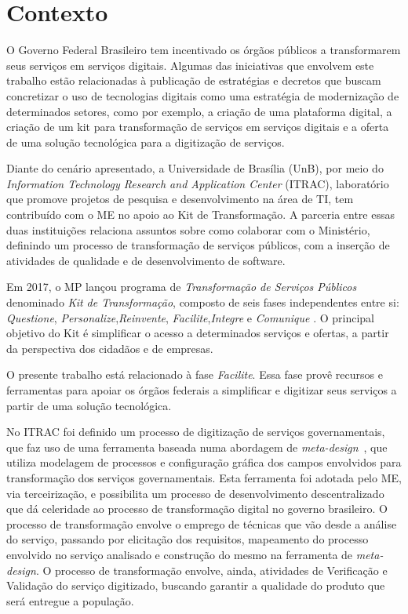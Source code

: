 \section{Contexto}

O Governo Federal Brasileiro tem incentivado os órgãos públicos a transformarem seus serviços em serviços digitais. Algumas das iniciativas que envolvem este trabalho estão relacionadas à publicação de estratégias e decretos que buscam concretizar o uso de tecnologias digitais como uma estratégia de modernização de determinados setores, como por exemplo, a criação de uma plataforma digital, a criação de um kit para transformação de serviços em serviços digitais e a oferta de uma solução tecnológica para a digitização de serviços. 

Diante do cenário apresentado, a Universidade de Brasília (UnB), por meio do \textit{Information Technology Research and Application Center} (ITRAC), laboratório que promove projetos de pesquisa e desenvolvimento na área de TI, tem contribuído com o ME no apoio ao Kit de Transformação. A parceria entre essas duas instituições relaciona assuntos sobre como colaborar com o Ministério, definindo um processo de transformação de serviços públicos, com a inserção de atividades de qualidade e de desenvolvimento de software.

Em 2017, o MP lançou programa de \textit{Transformação de Serviços Públicos} denominado \textit{Kit de Transformação}, composto de seis fases independentes entre si: \textit{Questione}, \textit{Personalize},\textit{Reinvente}, \textit{Facilite},\textit{Integre} e \textit{Comunique} \cite{BRASIL2017}. O principal objetivo do Kit é simplificar o acesso a determinados serviços e ofertas, a partir da perspectiva dos cidadãos e de empresas.

O presente trabalho está relacionado à fase \textit{Facilite}. Essa fase provê recursos e ferramentas para apoiar os órgãos federais a simplificar e digitizar seus serviços a partir de uma solução tecnológica.

No ITRAC foi definido um processo de digitização de serviços governamentais, que faz uso de uma ferramenta baseada numa abordagem de \textit{meta-design}~\cite{fogli2012meta}, que utiliza modelagem de processos e configuração gráfica dos campos envolvidos para transformação dos serviços governamentais. Esta ferramenta foi adotada pelo ME, via terceirização, e possibilita um processo de desenvolvimento descentralizado que dá celeridade ao processo de transformação digital no governo brasileiro. O processo de transformação envolve o emprego de técnicas que vão desde a análise do serviço, passando por elicitação dos requisitos, mapeamento do processo envolvido no serviço analisado e construção do mesmo na ferramenta de \textit{meta-design}. O processo de transformação envolve, ainda, atividades de Verificação e Validação do serviço digitizado, buscando garantir a qualidade do produto que será entregue a população.

